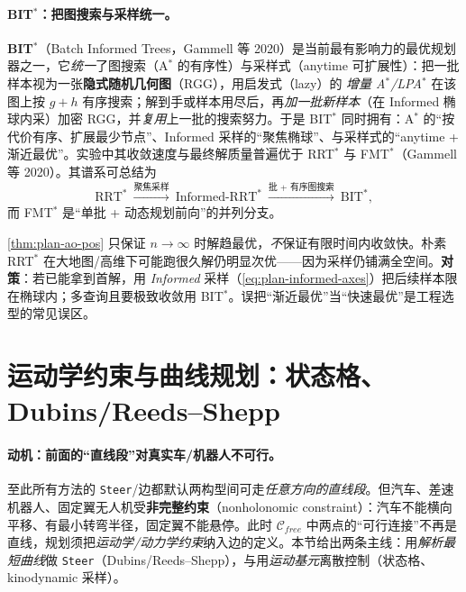 \paragraph{BIT$^*$：把图搜索与采样统一。}
\textbf{BIT$^*$}（Batch Informed Trees，Gammell 等 2020\cite{gammell2020bit}）是当前最有影响力的最优规划器之一，它\emph{统一}了图搜索（A$^*$ 的有序性）与采样式（anytime 可扩展性）：把一批样本视为一张\textbf{隐式随机几何图}（RGG），用启发式（lazy）的 \emph{增量 A$^*$/LPA$^*$} 在该图上按 $g+h$ 有序搜索；解到手或样本用尽后，再\emph{加一批新样本}（在 Informed 椭球内采）加密 RGG，并\emph{复用}上一批的搜索努力。于是 BIT$^*$ 同时拥有：A$^*$ 的“按代价有序、扩展最少节点”、Informed 采样的“聚焦椭球”、与采样式的“anytime + 渐近最优”。实验中其收敛速度与最终解质量普遍优于 RRT$^*$ 与 FMT$^*$（Gammell 等 2020）。其谱系可总结为
\[
  \text{RRT}^*\ \xrightarrow{\text{聚焦采样}}\ \text{Informed-RRT}^*\ \xrightarrow{\text{批 + 有序图搜索}}\ \text{BIT}^*,
\]
而 FMT$^*$ 是“单批 + 动态规划前向”的并列分支。

\begin{pitfall}
\cref{thm:plan-ao-pos} 只保证 $n\to\infty$ 时解趋最优，\emph{不}保证有限时间内收敛快。朴素 RRT$^*$ 在大地图/高维下可能跑很久解仍明显次优——因为采样仍铺满全空间。\textbf{对策}：若已能拿到首解，用 \emph{Informed} 采样（\cref{eq:plan-informed-axes}）把后续样本限在椭球内；多查询且要极致收敛用 BIT$^*$。误把“渐近最优”当“快速最优”是工程选型的常见误区。
\end{pitfall}

\section{运动学约束与曲线规划：状态格、Dubins/Reeds--Shepp}
\label{sec:plan-kinodynamic}

\paragraph{动机：前面的“直线段”对真实车/机器人不可行。}
至此所有方法的 \texttt{Steer}/边都默认两构型间可走\emph{任意方向的直线段}。但汽车、差速机器人、固定翼无人机受\textbf{非完整约束}（nonholonomic constraint）：汽车不能横向平移、有最小转弯半径，固定翼不能悬停。此时 $\mathcal{C}_{free}$ 中两点的“可行连接”不再是直线，规划须把\emph{运动学/动力学约束}纳入边的定义。本节给出两条主线：用\emph{解析最短曲线}做 \texttt{Steer}（Dubins/Reeds--Shepp），与用\emph{运动基元}离散控制（状态格、kinodynamic 采样）。

